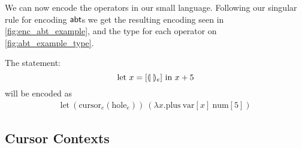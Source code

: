 \documentclass[sigplan,screen]{acmart}
\begin{document}
\begin{example}\label{ex:enc_abt_example}
    We can now encode the operators in our small language. Following
    our singular rule for encoding $\textsf{abt}$s we get the resulting encoding
    seen in \cref{fig:enc_abt_example}, and the type for each operator
    on \cref{fig:abt_example_type}.



\end{example}
%
The statement:
\begin{equation*}
        \text{let $x=[\llparenthesis \ \rrparenthesis_e]$ in $x+5$}
    \end{equation*}
will be encoded as
    \begin{align*}
        \text{let} \ (\text{cursor}_e(\text{hole}_e)) \ (\lambda x . \text{plus} \ \text{var}[x] \ \text{num}[5])
  \end{align*}




\subsection{Cursor Contexts}\label{sec:enc_cursor_contexts}
\end{document}
